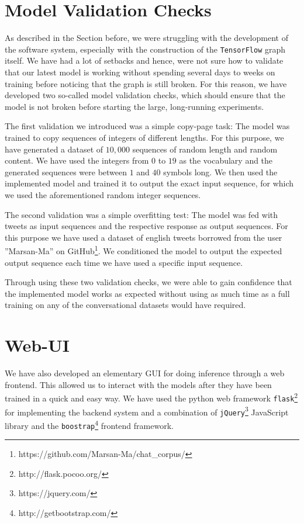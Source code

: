 \section{Model Validation Checks}
\label{software_sytem:model_validation_checks}
As described in the Section before, we were struggling with the development of the software system, especially with the construction of the \texttt{TensorFlow} graph itself. We have had a lot of setbacks and hence, were not sure how to validate that our latest model is working without spending several days to weeks on training before noticing that the graph is still broken. For this reason, we have developed two so-called model validation checks, which should ensure that the model is not broken before starting the large, long-running experiments.

The first validation we introduced was a simple copy-page task: The model was trained to copy sequences of integers of different lengths. For this purpose, we have generated a dataset of $10,000$ sequences of random length and random content. We have used the integers from $0$ to $19$ as the vocabulary and the generated sequences were between $1$ and $40$ symbols long. We then used the implemented model and trained it to output the exact input sequence, for which we used the aforementioned random integer sequences. 

The second validation was a simple overfitting test: The model was fed with tweets as input sequences and the respective response as output sequences. For this purpose we have used a dataset of english tweets borrowed from the user ''Marsan-Ma'' on GitHub\footnote{https://github.com/Marsan-Ma/chat\_corpus/}. We conditioned the model to output the expected output sequence each time we have used a specific input sequence.

Through using these two validation checks, we were able to gain confidence that the implemented model works as expected without using as much time as a full training on any of the conversational datasets would have required.

\section{Web-UI}
We have also developed an elementary GUI for doing inference through a web frontend. This allowed us to interact with the models after they have been trained in a quick and easy way. We have used the python web framework \texttt{flask}\footnote{http://flask.pocoo.org/} for implementing the backend system and a combination of \texttt{jQuery}\footnote{https://jquery.com/} JavaScript library and the \texttt{boostrap}\footnote{http://getbootstrap.com/} frontend framework.

